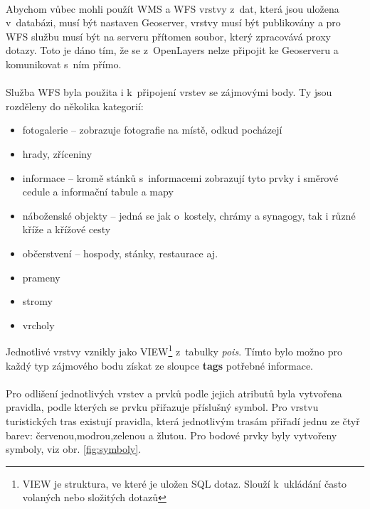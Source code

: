 \documentclass[11pt,a4paper,titlepage,oneside]{book}
\begin{document}
			\paragraph{} Abychom vůbec mohli použít \ac{WMS} a \ac{WFS} vrstvy z~dat, která jsou uložena v~databázi, musí být nastaven Geoserver, vrstvy musí být publikovány a pro \ac{WFS} službu musí být na serveru přítomen soubor, který zpracovává proxy dotazy. Toto je dáno tím, že se z~OpenLayers nelze připojit ke Geoserveru a komunikovat s~ním přímo. 

			\paragraph{} Služba \ac{WFS} byla použita i k~připojení vrstev se zájmovými body. Ty jsou rozděleny do několika kategorií:
					\begin{itemize}
						\item fotogalerie -- zobrazuje fotografie na místě, odkud pocházejí
						\item hrady, zříceniny
						\item informace -- kromě stánků s~informacemi zobrazují tyto prvky i směrové cedule a informační tabule a mapy
						\item náboženské objekty -- jedná se jak o~kostely, chrámy a synagogy, tak i různé kříže a křížové cesty
						\item občerstvení -- hospody, stánky, restaurace aj.
						\item prameny
						\item stromy
						\item vrcholy
					\end{itemize}	
Jednotlivé vrstvy vznikly jako VIEW\footnote{VIEW je struktura, ve které je uložen SQL dotaz. Slouží k~ukládání často volaných nebo složitých dotazů} z~tabulky \textit{pois}. Tímto bylo možno pro každý typ zájmového bodu získat ze sloupce \textbf{tags} potřebné informace.

			\paragraph{} Pro odlišení jednotlivých vrstev a prvků podle jejich atributů byla vytvořena pravidla, podle kterých se prvku přiřazuje příslušný symbol. Pro vrstvu turistických tras existují pravidla, která jednotlivým trasám přiřadí jednu ze čtyř barev: červenou,modrou,zelenou a žlutou. Pro bodové prvky byly vytvořeny symboly, viz obr. \ref{fig:symboly}.
			
\end{document}
